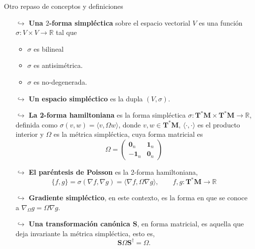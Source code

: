 \documentclass[8pt]{beamer}
\renewcommand{\>}{\rangle}
\newcommand{\<}{\langle}
\newcommand{\be}{\begin{equation}}
\newcommand{\ee}{\end{equation}}
\begin{document}
\begin{frame}{Otro repaso de conceptos y definiciones}

\begin{itemize}
\item[$\hookrightarrow$] {\bf Una $2$-forma simpléctica} sobre el espacio vectorial $V$ es una función $\sigma : V \times V \rightarrow \mathbb{R}$ tal que
\begin{itemize}
\item $\sigma$ es bilineal
\item $\sigma$ es antisimétrica.
\item $\sigma$ es no-degenerada.\\[10pt]
\end{itemize}
\item[$\hookrightarrow$] {\bf Un espacio simpléctico} es la dupla $(V,\sigma)$.\\[10pt]
\item[$\hookrightarrow$] {\bf La 2-forma hamiltoniana} es la forma simpléctica $\sigma : \mathbf{T^{\ast}M} \times \mathbf{T^{\ast}M} \rightarrow \mathbb{R}$, definida como $\sigma(v,w) = \< v,\Omega w \>$, donde $v, w \in \mathbf{T^{\ast}M}$, $\< \cdot , \cdot \>$ es el producto interior y $\Omega$ es la métrica simpléctica, cuya forma matricial es
\be 
	\Omega = \begin{pmatrix}
	\mathbf{0}_{n} & \mathbf{1}_{n} \\
	-\mathbf{1}_{n} & \mathbf{0}_{n}
	\end{pmatrix} \nonumber 
\ee
\item[$\hookrightarrow$] {\bf El paréntesis de Poisson} es la 2-forma hamiltoniana,
\be 
	\{ f, g \} =\sigma(\nabla f, \nabla g) = \< \nabla f, \Omega \nabla g \>,
	\qquad f,g : \mathbf{T^{\ast}M} \rightarrow \mathbb{R} \nonumber
\ee
\item[$\hookrightarrow$] {\bf Gradiente simpléctico}, en este contexto, es la forma en que se conoce a $\nabla_{\Omega} g = \Omega \nabla g$.
\item[$\hookrightarrow$] {\bf Una transformación canónica $\mathbf{S}$}, en forma matricial, es aquella que deja invariante la métrica simpléctica, esto es, $$\mathbf{S}\Omega\mathbf{S}^{\dagger} = \Omega .$$
\end{itemize}
\end{frame}
\end{document}
